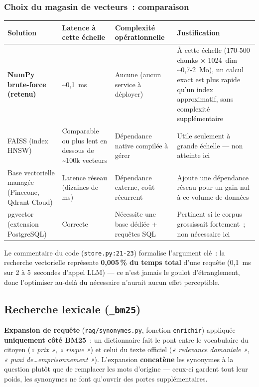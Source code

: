 \documentclass[11pt]{article}
\begin{document}
\subsubsection*{Choix du magasin de vecteurs~: comparaison}

\begin{tabularx}{\textwidth}{@{}l Y Y Y@{}}
\toprule
\textbf{Solution} & \textbf{Latence à cette échelle} & \textbf{Complexité opérationnelle} & \textbf{Justification} \\
\midrule
\textbf{NumPy brute-force (retenu)} & \textasciitilde0,1~ms & Aucune (aucun service à déployer) & À cette échelle (170-500 chunks $\times$ 1024~dim \textasciitilde0,7-2~Mo), un calcul exact est plus rapide qu'un index approximatif, sans complexité supplémentaire \\
FAISS (index HNSW) & Comparable ou plus lent en dessous de \textasciitilde100k vecteurs & Dépendance native compilée à gérer & Utile seulement à grande échelle --- non atteinte ici \\
Base vectorielle managée (Pinecone, Qdrant Cloud) & Latence réseau (dizaines de ms) & Dépendance externe, coût récurrent & Ajoute une dépendance réseau pour un gain nul à ce volume de données \\
pgvector (extension PostgreSQL) & Correcte & Nécessite une base dédiée + requêtes SQL & Pertinent si le corpus grossissait fortement~; non nécessaire ici \\
\bottomrule
\end{tabularx}

\vspace{0.5em}
Le commentaire du code (\texttt{store.py:21-23}) formalise l'argument clé~: la recherche
vectorielle représente \textbf{0,005\,\% du temps total} d'une requête (0,1~ms sur 2 à 5~secondes
d'appel LLM) --- ce n'est jamais le goulot d'étranglement, donc l'optimiser au-delà du nécessaire
n'aurait aucun effet perceptible.

\subsection{Recherche lexicale (\texttt{\_bm25})}

\textbf{Expansion de requête} (\texttt{rag/synonymes.py}, fonction \texttt{enrichir}) appliquée
\textbf{uniquement côté BM25}~: un dictionnaire fait le pont entre le vocabulaire du citoyen
(\textit{« prix »}, \textit{« risque »}) et celui du texte officiel (\textit{« redevance
domaniale »}, \textit{« puni de\ldots emprisonnement »}). L'expansion \textbf{concatène} les
synonymes à la question plutôt que de remplacer les mots d'origine --- ceux-ci gardent tout leur
poids, les synonymes ne font qu'ouvrir des portes supplémentaires.
\end{document}
